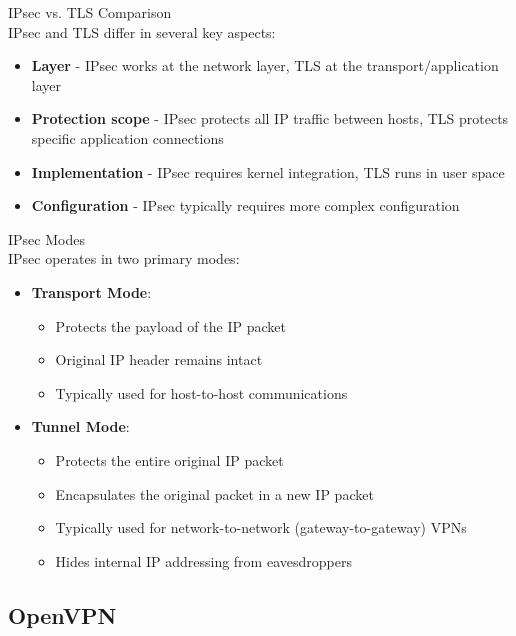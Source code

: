 \begin{theorem}{IPsec vs. TLS Comparison}\\
IPsec and TLS differ in several key aspects:
\begin{itemize}
    \item \textbf{Layer} - IPsec works at the network layer, TLS at the transport/application layer
    \item \textbf{Protection scope} - IPsec protects all IP traffic between hosts, TLS protects specific application connections
    \item \textbf{Implementation} - IPsec requires kernel integration, TLS runs in user space
    \item \textbf{Configuration} - IPsec typically requires more complex configuration
\end{itemize}
\end{theorem}

\begin{concept}{IPsec Modes}\\
IPsec operates in two primary modes:
\begin{itemize}
    \item \textbf{Transport Mode}:
    \begin{itemize}
        \item Protects the payload of the IP packet
        \item Original IP header remains intact
        \item Typically used for host-to-host communications
    \end{itemize}
    \item \textbf{Tunnel Mode}:
    \begin{itemize}
        \item Protects the entire original IP packet
        \item Encapsulates the original packet in a new IP packet
        \item Typically used for network-to-network (gateway-to-gateway) VPNs
        \item Hides internal IP addressing from eavesdroppers
    \end{itemize}
\end{itemize}
\end{concept}


\subsection{OpenVPN}

